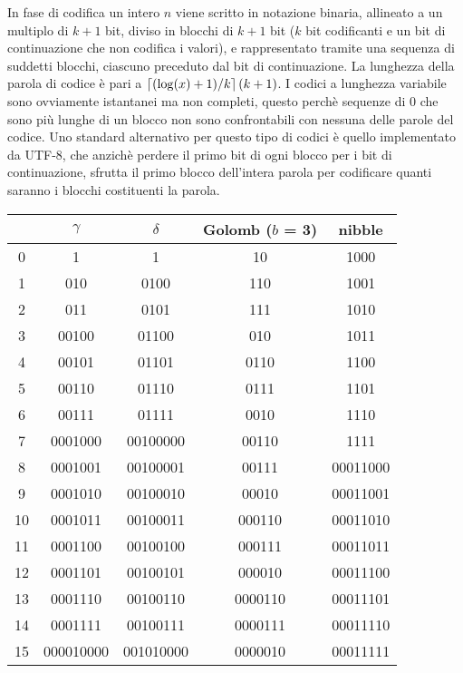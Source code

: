 In fase di codifica un intero $n$ viene scritto in notazione binaria, allineato a un multiplo di $k + 1$ bit, diviso in blocchi di $k + 1$ bit ($k$ bit codificanti e un bit di continuazione che non codifica i valori), e rappresentato tramite una sequenza di suddetti blocchi, ciascuno preceduto dal bit di continuazione. La lunghezza della parola di codice è pari a $\left\lceil (\log(x) + 1) / k \right\rceil(k + 1)$. I codici a lunghezza variabile sono ovviamente istantanei ma non completi, questo perchè sequenze di 0 che sono più lunghe di un blocco non sono confrontabili con nessuna delle parole del codice. Uno standard alternativo per questo tipo di codici è quello implementato da UTF-8, che anzichè perdere il primo bit di ogni blocco per i bit di continuazione, sfrutta il primo blocco dell'intera parola per codificare quanti saranno i blocchi costituenti la parola.
\begin{table}[ht]
    \centering
    \begin{tabular}{|c||c|c|c|c|}
      \hline
      &$\gamma$ &$\delta$ &Golomb ($b$ = 3) &nibble \\
      \hline
      0 &1 &1 &10 &1000 \\
      1 &010 &0100 &110 &1001 \\
      2 &011 &0101 &111 &1010 \\
      3 &00100 &01100 &010 &1011 \\
      4 &00101 &01101 &0110 &1100 \\
      5 &00110 &01110 &0111 &1101 \\
      6 &00111 &01111 &0010 &1110 \\
      7 &0001000 &00100000 & 00110 &1111 \\
      8 &0001001 &00100001 &00111 &00011000 \\
      9 &0001010 &00100010 &00010 &00011001 \\
      10 &0001011 &00100011 &000110 &00011010 \\
      11 &0001100 &00100100 &000111 &00011011 \\
      12 &0001101 &00100101 &000010 &00011100 \\
      13 &0001110 &00100110 &0000110 &00011101 \\
      14 &0001111 &00100111 &0000111 &00011110 \\
      15 &000010000 &001010000 &0000010 &00011111 \\
      \hline
    \end{tabular}
\end{table}
